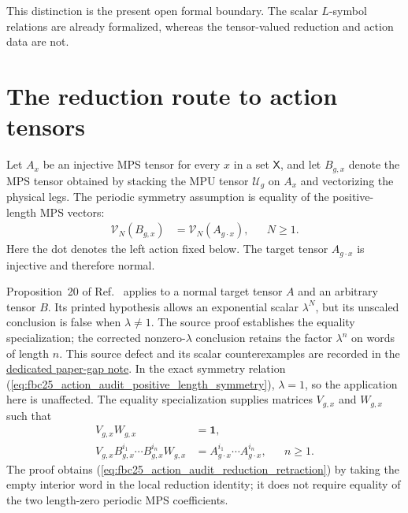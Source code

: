 \documentclass{article}
\begin{document}
This distinction is the present open formal boundary.  The scalar
$L$-symbol relations are already formalized, whereas the tensor-valued
reduction and action data are not.

\section{The reduction route to action tensors}

Let $A_x$ be an injective MPS tensor for every $x$ in a set $\mathsf X$, and
let $B_{g,x}$ denote the MPS tensor obtained by stacking the MPU tensor
$\mathcal U_g$ on $A_x$ and vectorizing the physical legs.  The periodic
symmetry assumption is equality of the positive-length MPS vectors:
\begin{align}
    \mathcal V_N(B_{g,x})
        &=\mathcal V_N(A_{g\mathbin{\cdot}x}),
        &&N\geq 1.
    \label{eq:fbc25_action_audit_positive_length_symmetry}
\end{align}
Here the dot denotes the left action fixed below.  The target tensor
$A_{g\mathbin{\cdot}x}$ is injective and therefore normal.

Proposition~20 of Ref.~\cite[source lines~3124--3133, with proof at
lines~3815--3939]{Molnar2018SemiInjective} applies to a normal target tensor
$A$ and an arbitrary tensor $B$.  Its printed hypothesis allows an exponential
scalar $\lambda^N$, but its unscaled conclusion is false when $\lambda\ne1$.
The source proof establishes the equality specialization; the corrected
nonzero-$\lambda$ conclusion retains the factor $\lambda^n$ on words of
length $n$.  This source defect and its scalar counterexamples are recorded in
the
\href{https://sirui-lu.com/TNLean/paper-gaps/mgsc18_reduction_proportionality_scalar.pdf}
{dedicated paper-gap note}.  In the exact symmetry relation
(\ref{eq:fbc25_action_audit_positive_length_symmetry}), $\lambda=1$, so the
application here is unaffected.  The equality specialization supplies
matrices $V_{g,x}$ and $W_{g,x}$ such that
\begin{align}
    V_{g,x}W_{g,x}
        &=\mathbf 1,
    \label{eq:fbc25_action_audit_reduction_retraction}\\
    V_{g,x}B_{g,x}^{i_1}\cdots B_{g,x}^{i_n}W_{g,x}
        &=A_{g\mathbin{\cdot}x}^{i_1}\cdots
          A_{g\mathbin{\cdot}x}^{i_n},
        &&n\geq 1.
    \label{eq:fbc25_action_audit_reduction_words}
\end{align}
The proof obtains
(\ref{eq:fbc25_action_audit_reduction_retraction}) by taking the empty
interior word in the local reduction identity; it does not require equality
of the two length-zero periodic MPS coefficients.
\end{document}

